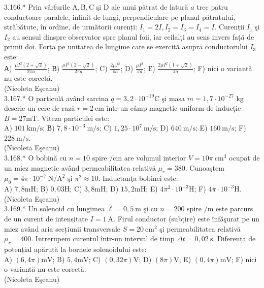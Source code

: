 \documentclass[10pt]{article}
\begin{document}
3.166.* Prin vârfurile $\mathrm{A}, \mathrm{B}, \mathrm{C}$ şi $\mathrm{D}$ ale unui pătrat de latură $a$ trec patru conductoare paralele, infinit de lungi, perpendiculare pe planul pătratului, străbătute, în ordine, de următorii curenți: $I_{1}=2 I, I_{2}=I_{3}=I_{4}=I$. Curenții $I_{1}$ şi $I_{2}$ au sensul dinspre observator spre planul foii, iar ceilalți au sens invers față de primii doi. Forța pe unitatea de lungime care se exercită asupra conductorului $I_{3}$ este:\\ А) $\frac{\mu I^{2}(2+\sqrt{2})}{2 \pi a}$; В) $\frac{\mu I^{2}(2-\sqrt{2})}{2 \pi a}$; C) $\frac{2 \mu I^{2}}{\pi a}$; D) $\frac{\mu I^{2}}{\pi a}$; Е) $\frac{2 \mu I^{2}(1+\sqrt{2})}{\pi a}$; F) nici o variantǎ nu este corectă.\\ (Nicoleta Eşeanu)\\

3.167.* O particulă având sarcina $q=3,2 \cdot 10^{-19} \mathrm{C}$ şi masa $m=1,7 \cdot 10^{-27}$ kg descrie un cerc de rază $r=2 \mathrm{~cm}$ într-un câmp magnetic uniform de inducție $B=27 \mathrm{mT}$. Viteza particulei este:\\ A) $101 \mathrm{~km} / \mathrm{s}$; В) $7,8 \cdot 10^{-3} \mathrm{~m} / \mathrm{s}$; C) $1,25 \cdot 10^{7} \mathrm{~m} / \mathrm{s}$; D) $640 \mathrm{~m} / \mathrm{s}$; E) $160 \mathrm{~m} / \mathrm{s}$; F) $228 \mathrm{~m} / \mathrm{s}$.\\ (Nicoleta Eşeanu)\\

3.168.* O bobină cu $n=10$ spire $/ \mathrm{cm}$ are volumul interior $V=10 \pi \mathrm{~cm}^{3}$ ocupat de un miez magnetic având permeabilitatea relativă $\mu_{r}=380$. Cunoaştem $\mu_{0}=4 \pi \cdot 10^{-7} \mathrm{~N} / \mathrm{A}^{2}$ şi $\pi^{2} \approx 10$. Inductanţa bobinei este:\\ A) $7,8 \mathrm{mH}$; B) $0,03 \mathrm{H}$; C) $3,8 \mathrm{mH}$; D) $15,2 \mathrm{mH}$; E) $4 \pi^{2} \cdot 10^{-3} \mathrm{H}$; F) $4 \pi \cdot 10^{-3} \mathrm{H}$.\\ (Nicoleta Eşeanu)\\

3.169.* Un solenoid cu lungimea $\ell=0,5 \mathrm{~m}$ şi cu $n=200$ spire $/ \mathrm{m}$ este parcurs de un curent de intensitate $I=1 \mathrm{~A}$. Firul conductor (subțire) este înfăşurat pe un miez având aria secțiunii transversale $S=20 \mathrm{~cm}^{2}$ şi permeabilitatea relativă $\mu_{r}=400$. Intrerupem curentul într-un interval de timp $\Delta t=0,02 \mathrm{~s}$. Diferența de potențial apărută la bornele solenoidului este:\\ A) $(6,4 \pi) \mathrm{mV}$; B) $5,4 \mathrm{mV}$; C) $(0,32 \pi) \mathrm{V}$; D) $(8 \pi) \mathrm{V}$; E) $(0,4 \pi) \mathrm{mV}$; F) nici o variantă nu este corectă.\\ (Nicoleta Eşeanu)\\
\end{document}
